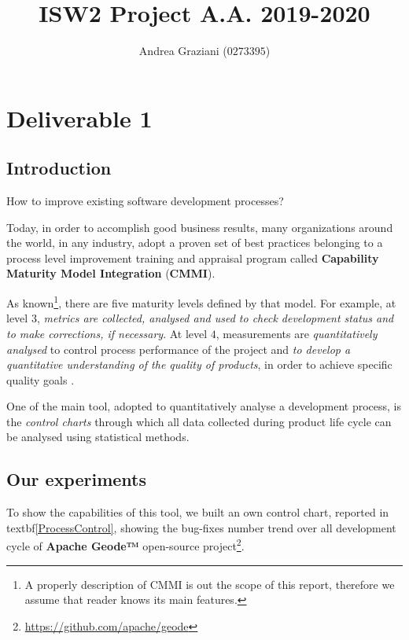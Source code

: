 \documentclass[sigconf]{acmart}
\begin{document}
\title{ISW2 Project A.A. 2019-2020}

\author{Andrea Graziani ($0273395$)}

\maketitle
\section{Deliverable 1}

\subsection{Introduction}

How to improve existing software development processes?

Today, in order to accomplish good business results, many organizations around the world, in any industry, adopt a proven set of best practices belonging to a process level improvement training and appraisal program called \textbf{Capability Maturity Model Integration} (\textbf{CMMI})\cite{CMMIINSTITUTE}.

As known\footnote{A properly description of CMMI is out the scope of this report, therefore we assume that reader knows its main features.}, there are five maturity levels defined by that model. For example, at level $3$, \textit{metrics are collected, analysed and used to check development status and to make corrections, if necessary}. At level $4$, measurements are \textit{quantitatively analysed} to control process performance of the project and \textit{to develop a quantitative understanding of the quality of products}, in order to achieve specific quality goals \cite{FLORENCE}.

One of the main tool, adopted to quantitatively analyse a development process, is the \textit{control charts} 
through which all data collected during product life cycle can be analysed using statistical methods\cite{FLORENCE}.

\subsection{Our experiments}

To show the capabilities of this tool, we built an own control chart, reported in textbf{\cref{ProcessControl}}, showing the bug-fixes number trend over all development cycle of \textbf{Apache Geode™} open-source project\footnote{\url{https://github.com/apache/geode}}.
\end{document}
